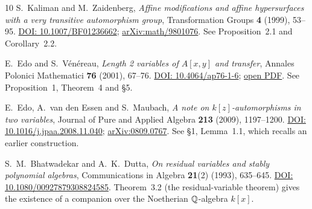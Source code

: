 \begin{thebibliography}{10}
S.~Kaliman and M.~Zaidenberg,
\emph{Affine modifications and affine hypersurfaces with a very
transitive automorphism group},
Transformation Groups \textbf{4} (1999), 53--95.
\href{https://doi.org/10.1007/BF01236662}{DOI: 10.1007/BF01236662};
\href{https://arxiv.org/abs/math/9801076}{arXiv:math/9801076}.
See Proposition~2.1 and Corollary~2.2.

E.~Edo and S.~V\'en\'ereau,
\emph{Length 2 variables of $A[x,y]$ and transfer},
Annales Polonici Mathematici \textbf{76} (2001), 67--76.
\href{https://doi.org/10.4064/ap76-1-6}{DOI: 10.4064/ap76-1-6};
\href{https://www.impan.pl/shop/publication/transaction/download/product/85204}{open PDF}.
See Proposition~1, Theorem~4 and \S5.

E.~Edo, A.~van den Essen and S.~Maubach,
\emph{A note on $k[z]$-automorphisms in two variables},
Journal of Pure and Applied Algebra \textbf{213} (2009), 1197--1200.
\href{https://doi.org/10.1016/j.jpaa.2008.11.040}{DOI: 10.1016/j.jpaa.2008.11.040};
\href{https://arxiv.org/abs/0809.0767}{arXiv:0809.0767}.
See \S1, Lemma~1.1, which recalls an earlier construction.

S.~M.~Bhatwadekar and A.~K.~Dutta,
\emph{On residual variables and stably polynomial algebras},
Communications in Algebra \textbf{21}(2) (1993), 635--645.
\href{https://doi.org/10.1080/00927879308824585}{DOI: 10.1080/00927879308824585}.
Theorem~3.2 (the residual-variable theorem) gives the existence of a companion over
the Noetherian $\mathbb Q$-algebra $k[x]$.

\end{thebibliography}
